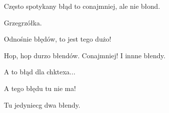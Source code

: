 \documentclass{article}
\begin{document}
Często spotykany błąd to conajmniej, ale nie błond. %

Grzegrzółka.

Odnośnie błędów, to jest tego dużo!

Hop, hop durzo błendów. Conajmniej! I innne błendy.

A to błąd dla chktexa... %

A tego błędu tu nie ma! %

Tu jedyniecg dwa błendy.


\end{document}
